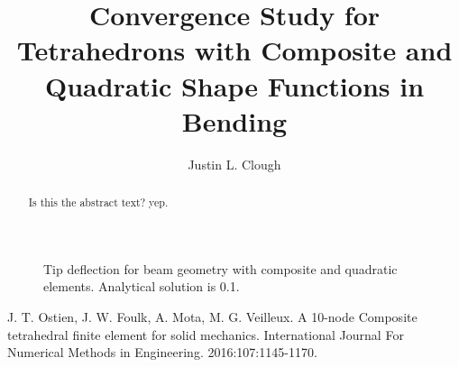 \documentclass[a4paper, 12pt]{article}
\author{Justin L. Clough}
\title{Convergence Study for Tetrahedrons with Composite and Quadratic Shape Functions in Bending}
\begin{document}
\maketitle

\begin{abstract}
Is this the abstract text? yep.
\end{abstract}




\begin{figure}[H]
  \centering
  \caption{Tip deflection for beam geometry with composite and quadratic elements.
           Analytical solution is 0.1.}
  \label{fig:label}
\end{figure}

\newpage


\begin{thebibliography}{99}

J. T. Ostien,
J. W. Foulk,
A. Mota,
M. G. Veilleux.
A 10-node Composite tetrahedral finite element for solid mechanics.
International Journal For Numerical Methods in Engineering.
2016:107:1145-1170. 

\end{thebibliography}
\end{document}
